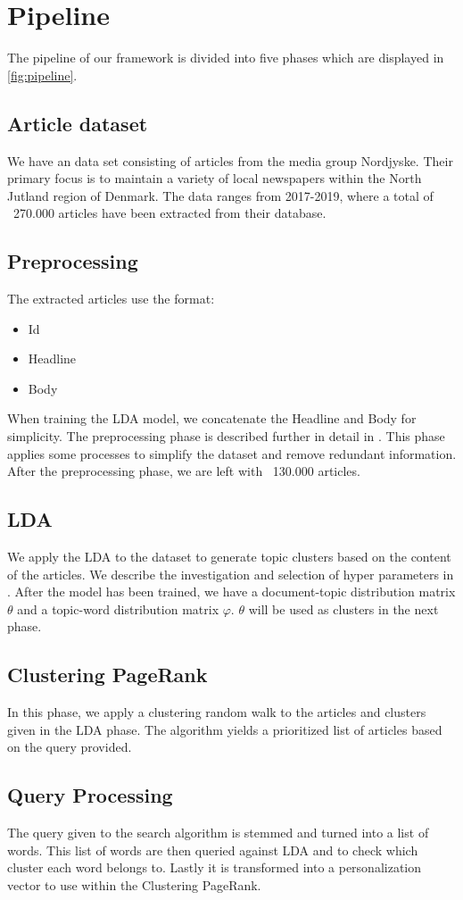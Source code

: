 \section{Pipeline}


The pipeline of our framework is divided into five phases which are displayed in \autoref{fig:pipeline}.

\subsection{Article dataset}
We have an data set consisting of articles from the media group Nordjyske. Their primary focus is to maintain a variety of local newspapers within the North Jutland region of Denmark. 
The data ranges from 2017-2019, where a total of ~270.000 articles have been extracted from their database.

\subsection{Preprocessing}
The extracted articles use the format:
\begin{itemize}
	\item Id
	\item Headline
	\item Body
\end{itemize}
When training the LDA model, we concatenate the Headline and Body for simplicity.
The preprocessing phase is described further in detail in .
This phase applies some processes to simplify the dataset and remove redundant information. 
After the preprocessing phase, we are left with ~130.000 articles.

\subsection{LDA}
We apply the \acrfull{LDA} to the dataset to generate topic clusters based on the content of the articles. 
We describe the investigation and selection of hyper parameters in . 
After the model has been trained, we have a document-topic distribution matrix $\theta$ and a topic-word distribution matrix $\varphi$.
$\theta$ will be used as clusters in the next phase.

\subsection{Clustering PageRank}
In this phase, we apply a clustering random walk to the articles and clusters given in the \gls{LDA} phase.
The algorithm yields a prioritized list of articles based on the query provided.


\subsection{Query Processing}
The query given to the search algorithm is stemmed and turned into a list of words. 
This list of words are then queried against LDA and to check which cluster each word belongs to.
Lastly it is transformed into a personalization vector to use within the Clustering PageRank.


